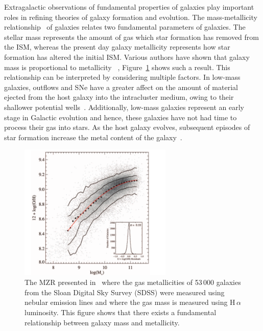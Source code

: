 Extragalactic observations of fundamental properties of galaxies play important roles in refining theories of galaxy formation and evolution.
The mass-metallicity relationship~\citep[MZR;][]{Lequeux79} of galaxies relates two fundamental parameters of galaxies.
The stellar mass represents the amount of gas which star formation has removed from the ISM, whereas the present day galaxy metallicity represents how star formation has altered the initial ISM.
Various authors have shown that galaxy mass is proportional to metallicity
~\citep{Tremonti04, Maiolino08,Kewley08}, Figure~\ref{fig:MZR} shows such a result.
This relationship can be interpreted by considering multiple factors.
In low-mass galaxies, outflows and SNe have a greater affect on the amount of material ejected from the host galaxy into the intracluster medium, owing to their shallower potential wells~\citep[e.g.][]{Tremonti04}.
Additionally, low-mass galaxies represent an early stage in Galactic evolution and hence, these galaxies have not had time to process their gas into stars.
As the host galaxy evolves, subsequent episodes of star formation increase the metal content of the galaxy~\citep[e.g.][and references therein]{Maiolino08}.


\begin{figure}
 \centering
 \includegraphics[width=0.65\textwidth]{intro/MZR}
 \caption[\citeauthor{Tremonti04} Mass-metallicity relationship]{The MZR presented in~\citep{Tremonti04} where the gas metallicities of 53\,000 galaxies from the Sloan Digital Sky Survey (SDSS) were measured using nebular emission lines and where the gas mass is measured using H\,$\alpha$ luminosity.
 This figure shows that there exists a fundamental relationship between galaxy mass and metallicity.
 \label{fig:MZR}}
\end{figure}

